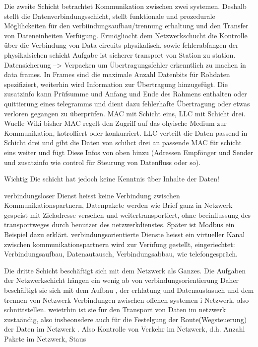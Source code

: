Die zweite Schicht betrachtet Kommunikation zwischen zwei systemen. Deshalb stellt die Datenverbindungsschicht, stellt funktionale und prozedurale Möglihckeiten für den verbiindungsaufbau/trennung erhaltung und den Transfer von Dateneinheiten Verfügung. Ermögliocht dem Netzwerkschucht die Kontrolle über die Verbindung von Data circuits physikalisch, sowie fehlerabfangen der physikalsichen schicht \cite[S.~46f.]{osi96}
Aufgabe ist sicherer transport von Station zu station. Datensicherung --> Verpacken um Übertragungsfehler erkenntlich zu machen in data frames. In Frames sind die maximale Anzahl Datenbits für Rohdaten spezifiziert, weiterhin wird Information zur Übertragung hinzugefügt. Die zusatzinfo kann Prüfsumme und Anfang und Ende des Rahmens enthalten oder quittierung eines telegramms und dient dazu fehlerhafte Übertragung oder etwas verloren gegangen zu überprüfen. MAC mit Schicht eins, LLC mit Schicht drei.
Wuelle Wiki bisher
MAC regelt den Zugriff auf das ohyische Medium zur Kommunikation, kotrolliert oder konkurriert.
LLC verteilt die Daten passend in Schicht drei und gibt die Daten von schihct drei an passende MAC für schicht eins weiter und fügt Diese Infos von oben hinzu (Adressen Empfönger und Sender und zusatzinfo wie control für Steurung von Datenfluss oder so).

Wichtig Die schicht hat jedoch keine Kenntnis über Inhalte der Daten!\cite[S.~9ff.]{schn06}

verbindungsloser Dienst heisst keine Verbindung zwischen Kommunikationspartnern, Datenpakete werden wie Brief ganz in Netzwerk gespeist mit Zieladresse versehen und weitertransportiert, ohne beeinflussung des transportweges durch benutzer des netzwerkdienstes. Später ist Modbus ein Beispiel dazu erklärt.
verbindungsorientierte Dienste heisst ein virtueller Kanal zwischen kommunikationspartnern wird zur Verüfung gestellt, eingeriechtet: Verbindungsaufbau, Datenautausch, Verbindungsabbau, wie telefongespräch. \cite[S.~11f.]{schn06}


Die dritte Schicht beschäftigt sich mit dem Netzwerk als Ganzes. Die Aufgaben der Netzwerkschicht hängen ein wenig ab von verbindungsorientierung Daher beschäftigt sie sich mit dem Aufbau , der erhlatung und Datenaustasuch und dem trennen von Netzwerk Verbindungen zwischen offenen systemen i Netzwerk, also schnittstellen. weietrhin ist sie für den Transport von Daten im netzwerk zustaändig, also insbeonsdere auch für die Festelgung der Route(Wegsteuerung) der Daten im Netzwerk \cite[S.~41f.]{osi96}.
Also Kontrolle von Verkehr im Netzwerk, d.h. Anzahl Pakete im Netzwerk, Staus \cite[S.~11f.]{schn06}


